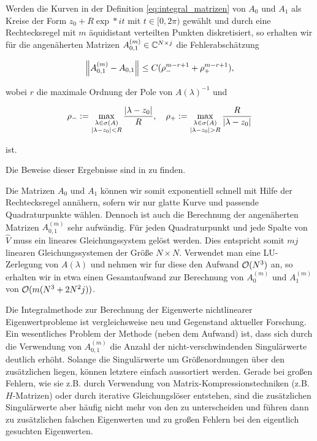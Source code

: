 \begin{theorem}

    Werden die Kurven in der Definition \eqref{eq:integral_matrizen} von $A_0$ und $A_1$ als Kreise der Form $z_0 + R \exp*{i t}$ mit $t \in [0, 2 \pi)$ gewählt und durch eine Rechtecksregel mit $m$ äquidistant verteilten Punkten diskretisiert, so erhalten wir für die angenäherten Matrizen $A_{0, 1}^{(m)} \in \mathbb{C}^{N \times j}$ die Fehlerabschätzung

    \begin{align*}
        {\left \| A_{0, 1}^{(m)} - A_{0, 1} \right \|}_{}
        \leq
        C (\rho_-^{m - r + 1} + \rho_+^{m - r + 1}),
    \end{align*}

    wobei $r$ die maximale Ordnung der Pole von $A(\lambda)^{-1}$ und

    \begin{align*}
        \rho_-
        :=
        \max_{\substack{\lambda \in \sigma(A) \\ {\left | \lambda - z_0 \right |} < R}}
            \frac{{\left | \lambda - z_0 \right |}}{R},
        \quad
        \rho_+
        :=
        \max_{\substack{\lambda \in \sigma(A) \\ {\left | \lambda - z_0 \right |} > R}}
            \frac{R}{{\left | \lambda - z_0 \right |}}
    \end{align*}

    ist.

\end{theorem}

Die Beweise dieser Ergebnisse sind in \cite{EWPs} zu finden.

Die Matrizen $A_0$ und $A_1$ können wir somit exponentiell schnell mit Hilfe der Rechtecksregel annähern, sofern wir nur glatte Kurve und passende Quadraturpunkte wählen.
Dennoch ist auch die Berechnung der angenäherten Matrizen $A_{0, 1}^{(m)}$ sehr aufwändig.
Für jeden Quadraturpunkt und jede Spalte von $\hat V$ muss ein lineares Gleichungssystem gelöst werden.
Dies entspricht somit $m j$ linearen Gleichungssystemen der Größe $N \times N$.
Verwendet man eine LU-Zerlegung von $A(\lambda)$ und nehmen wir fur diese den Aufwand $\mathcal{O}(N^3)$ an, so erhalten wir in etwa einen Gesamtaufwand zur Berechnung von $A_0^{(m)}$ und $A_1^{(m)}$ von $\mathcal{O}(m (N^3 + 2 N^2 j))$.

Die Integralmethode zur Berechnung der Eigenwerte nichtlinearer Eigenwertprobleme ist vergleichsweise neu und Gegenstand aktueller Forschung.
Ein wesentliches Problem der Methode (neben dem Aufwand) ist, dass sich durch die Verwendung von $A_{0, 1}^{(m)}$ die Anzahl der nicht-verschwindenden Singulärwerte deutlich erhöht.
Solange die  Singulärwerte um Größenordnungen über den zusätzlichen liegen, können letztere einfach aussortiert werden.
Gerade bei großen Fehlern, wie sie z.B. durch Verwendung von Matrix-Kompressionstechniken (z.B. $H$-Matrizen) oder durch iterative Gleichungslöser entstehen, sind die zusätzlichen Singulärwerte aber häufig nicht mehr von den  zu unterscheiden und führen dann zu zusätzlichen falschen Eigenwerten und zu großen Fehlern bei den eigentlich gesuchten Eigenwerten.

